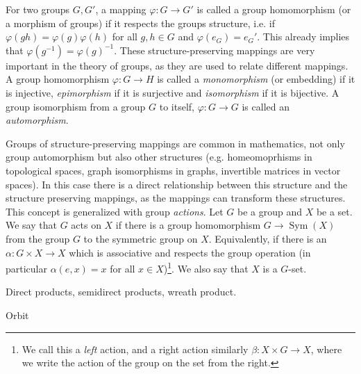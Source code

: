 For two groups $G, G'$, a mapping $\varphi : G \rightarrow G'$ is called a group homomorphism (or a morphism of groups) if it respects the groups structure, i.e. 
if $\varphi(gh) = \varphi(g) \varphi(h)$ for all $g,h \in G$ and $\varphi(e_G) = e_G'$. This already implies that $\varphi(g^{-1}) = \varphi(g)^{-1}$.
These structure-preserving mappings are very important in the theory of groups, as they are used to relate different mappings. 
A group homomorphism $\varphi : G \rightarrow H$ is called a \emph{monomorphism} (or embedding) if it is injective, \emph{epimorphism} if it is surjective and \emph{isomorphism} if it is bijective.
A group isomorphism from a group $G$ to itself, $\varphi : G \rightarrow G$ is called an \emph{automorphism}.


Groups of structure-preserving mappings are common in mathematics, not only group automorphism but also other structures (e.g. homeomoprhisms in topological spaces, graph isomorphisms in graphs, invertible matrices in vector spaces).
In this case there is a direct relationship between this structure and the structure preserving mappings, as the mappings can transform these structures.
This concept is generalized with group \emph{actions}. Let $G$ be a group and $X$ be a set.
We say that $G$ acts on $X$ if there is a group homomorphism $G \rightarrow \operatorname{Sym}(X)$ from the group $G$ to the symmetric group on $X$. 
Equivalently, if there is an $\alpha : G \times X \rightarrow X$ which is associative and respects the group operation (in particular $\alpha(e,x) = x$ for all $x \in X$)\footnote{We
call this a \emph{left} action, and a right action similarly $\beta  : X \times G \rightarrow X$, where we write the action of the group on the set from the right.}. 
We also say that $X$ is a $G$-set.

Direct products, semidirect products, wreath product.

Orbit